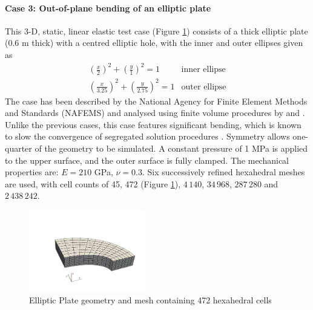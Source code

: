 \documentclass[sn-mathphys,Numbered]{sn-jnl}%
\begin{document}
\paragraph{Case 3: Out-of-plane bending of an elliptic plate}
This 3-D, static, linear elastic test case (Figure \ref{fig:elliptic_plate}) consists of a thick elliptic plate (0.6 m thick) with a centred elliptic hole, with the inner and outer ellipses given as
\begin{eqnarray}
	\left(\frac{x}{2}\right)^2 + \left(\frac{y}{1}\right)^2 = 1 & \text{inner ellipse} \\
	\left(\frac{x}{3.25}\right)^2 + \left(\frac{y}{2.75}\right)^2 = 1 & \text{outer ellipse}
\end{eqnarray}
The case has been described by the National Agency for Finite Element Methods and Standards (NAFEMS) \cite{Hitchings1987} and analysed using finite volume procedures by \citet{Demirdzic1997a} and \citet{Cardiff2016a}.
Unlike the previous cases, this case features significant bending, which is known to slow the convergence of segregated solution procedures \citep{Cardiff2016a}.
Symmetry allows one-quarter of the geometry to be simulated.
A constant pressure of 1 MPa is applied to the upper surface, and the outer surface is fully clamped.
The mechanical properties are: $E = 210$ GPa, $\nu = 0.3$.
Six successively refined hexahedral meshes are used, with cell counts of 45, 472 (Figure \ref{fig:elliptic_plate}), $4\,140$, $34\,968$, $287\,280$ and $2\,438\,242$.
\begin{figure}[htbp]
   \centering
		\includegraphics[width=0.45\textwidth]{figures/elliptic_plate.pdf} 
   \caption{Elliptic Plate geometry and mesh containing 472 hexahedral cells}
   \label{fig:elliptic_plate}
\end{figure}
\end{document}
